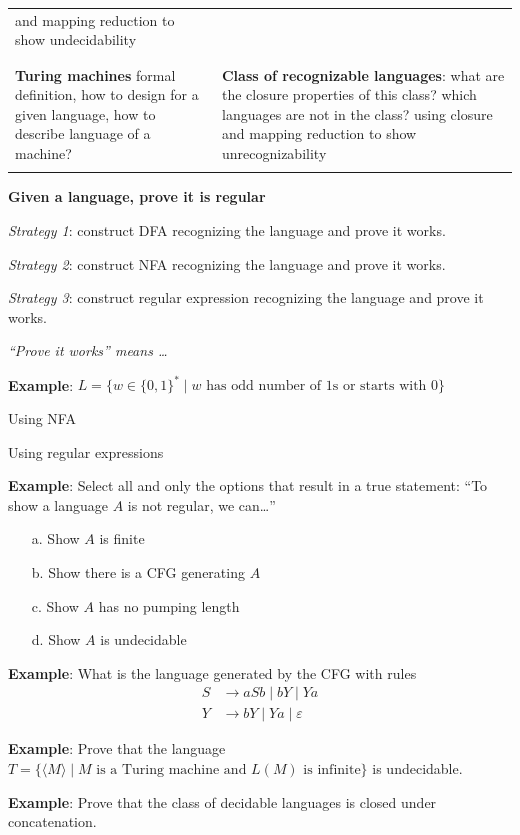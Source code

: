 \documentclass[12pt, oneside]{article}
\begin{document}
\begin{center}
\begin{tabular}{|p{4in}|p{3.5in}|}
        and mapping reduction to show undecidability \\
        & \\
        \hline
        & \\
        {\bf Turing machines}
        formal definition, how to design for a given language, 
        how to describe language of a machine? &
        {\bf Class of recognizable languages}: what are the closure properties 
        of this class? which languages are not in the class? using closure
        and mapping reduction to show unrecognizability \\
        & \\
        \hline
    \end{tabular}
\end{center}

\newpage

{\bf Given a language, prove it is regular}

{\it Strategy 1}: construct DFA recognizing the language and prove it works.

{\it Strategy 2}: construct NFA recognizing the language and prove it works.

{\it Strategy 3}: construct regular expression recognizing the language and prove it works.

{\it ``Prove it works'' means \ldots}

\vspace{100pt}

{\bf Example}: $L  = \{ w \in \{0,1\}^* \mid \textrm{$w$ has odd number of $1$s or starts with $0$}\}$

Using NFA

\vfill

Using regular expressions

\vfill


\newpage

{\bf Example}: Select all and only the options that result in a true statement: ``To show 
a language $A$ is not regular, we can\ldots'' 

\begin{enumerate}
    \item[a.] Show $A$ is finite
    \item[b.] Show there is a CFG generating $A$
    \item[c.] Show $A$ has no pumping length
    \item[d.] Show $A$ is undecidable
\end{enumerate}

\newpage

{\bf Example}: What is the language generated by the CFG with rules
\begin{align*}
    S &\to aSb \mid bY \mid Ya \\
    Y &\to bY \mid Ya \mid \varepsilon 
\end{align*}

\newpage

{\bf Example}: Prove that the language 
$T = \{ \langle M \rangle \mid \textrm{$M$ is a Turing machine and $L(M)$ is infinite}\}$ 
is undecidable.

\newpage

{\bf Example}: Prove that the class of decidable languages is closed under concatenation.
 \vfill
\end{document}

